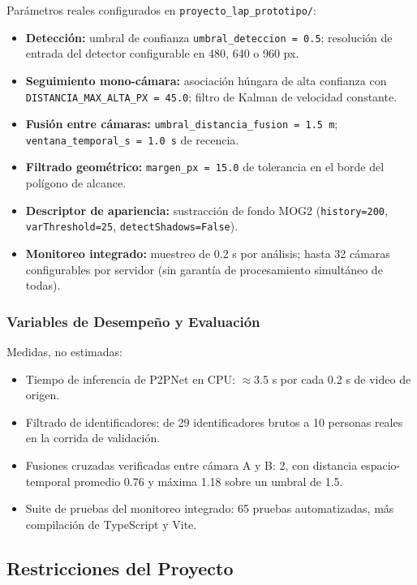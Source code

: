 Parámetros reales configurados en \texttt{proyecto\_lap\_prototipo/}:

\begin{itemize}
  \item \textbf{Detección:} umbral de confianza \texttt{umbral\_deteccion = 0.5}; resolución de
  entrada del detector configurable en 480, 640 o 960 px.
  \item \textbf{Seguimiento mono-cámara:} asociación húngara de alta confianza con
  \texttt{DISTANCIA\_MAX\_ALTA\_PX = 45.0}; filtro de Kalman de velocidad constante.
  \item \textbf{Fusión entre cámaras:} \texttt{umbral\_distancia\_fusion = 1.5 m};
  \texttt{ventana\_temporal\_s = 1.0 s} de recencia.
  \item \textbf{Filtrado geométrico:} \texttt{margen\_px = 15.0} de tolerancia en el borde del
  polígono de alcance.
  \item \textbf{Descriptor de apariencia:} sustracción de fondo MOG2 (\texttt{history=200},
  \texttt{varThreshold=25}, \texttt{detectShadows=False}).
  \item \textbf{Monitoreo integrado:} muestreo de 0.2 s por análisis; hasta 32 cámaras
  configurables por servidor (sin garantía de procesamiento simultáneo de todas).
\end{itemize}

\subsubsection{Variables de Desempeño y Evaluación}

Medidas, no estimadas:

\begin{itemize}
  \item Tiempo de inferencia de P2PNet en CPU: $\approx$3.5 s por cada 0.2 s de video de
  origen.
  \item Filtrado de identificadores: de 29 identificadores brutos a 10 personas reales en la
  corrida de validación.
  \item Fusiones cruzadas verificadas entre cámara A y B: 2, con distancia espacio-temporal
  promedio 0.76 y máxima 1.18 sobre un umbral de 1.5.
  \item Suite de pruebas del monitoreo integrado: 65 pruebas automatizadas, más compilación
  de TypeScript y Vite.
\end{itemize}

\subsection{Restricciones del Proyecto}
\label{subsec:restricciones}

